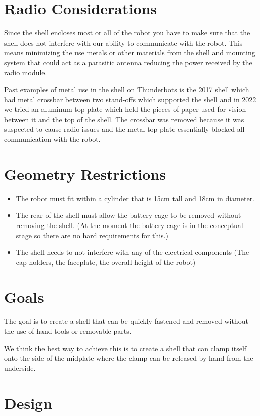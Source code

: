 \documentclass{iopart}
\begin{document}
\section{Radio Considerations}
Since the shell encloses most or all of the robot you have to make sure that the shell does not interfere with our ability to communicate with the robot. This means minimizing the use metals or other materials from the shell and mounting system that could act as a parasitic antenna reducing the power received by the radio module.

Past examples of metal use in the shell on Thunderbots is the 2017 shell which had metal crossbar between two stand-offs which supported the shell and in 2022 we tried an aluminum top plate which held the pieces of paper used for vision between it and the top of the shell. The crossbar was removed because it was suspected to cause radio issues and the metal top plate essentially blocked all communication with the robot.

\section{Geometry Restrictions}
\begin{itemize}
    \item The robot must fit within a cylinder that is 15cm tall and 18cm in diameter.
    \item The rear of the shell must allow the battery cage to be removed without removing the shell. (At the moment the battery cage is in the conceptual stage so there are no hard requirements for this.)
    \item The shell needs to not interfere with any of the electrical components (The cap holders, the faceplate, the overall height of the robot)
\end{itemize}

\section{Goals}
The goal is to create a shell that can be quickly fastened and removed without the use of hand tools or removable parts.

We think the best way to achieve this is to create a shell that can clamp itself onto the side of the midplate where the clamp can be released by hand from the underside.

\section{Design}
\end{document}
